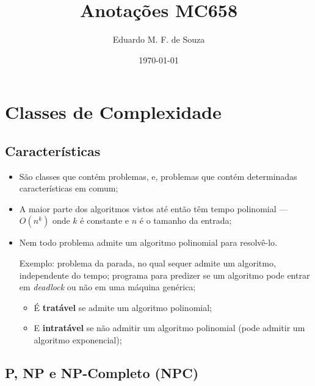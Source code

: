\documentclass[a4paper,oneside,article,table]{article}
\title{Anotações MC658}
\author{Eduardo M. F. de Souza}
\date{\today}
\begin{document}
\maketitle


\tableofcontents
\newpage

\section{Classes de Complexidade}

\subsection{Características}

\begin{itemize}

    \item São classes que contém problemas, e, problemas que contém determinadas características em comum;
    \item A maior parte dos algoritmos vistos até então têm tempo polinomial --- $O(n^k)$ onde $k$ é constante e $n$ é o tamanho da entrada;
    \item Nem todo problema admite um algoritmo polinomial para resolvê-lo. \par
        Exemplo: problema da parada, no qual sequer admite um algoritmo, independente do tempo; programa para predizer se um algoritmo pode entrar em \textit{deadlock} ou não em uma máquina genérica;
        \begin{itemize}
        \item É \textbf{tratável} se admite um algoritmo polinomial;
        \item E \textbf{intratável} se não admitir um algoritmo polinomial (pode admitir um algoritmo exponencial);
    \end{itemize}

\end{itemize}

\subsection{P, NP e NP-Completo (NPC)}
\end{document}
